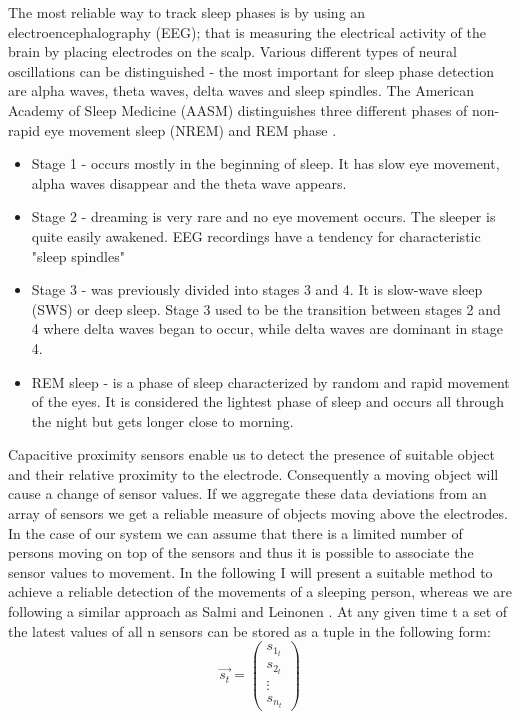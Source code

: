 The most reliable way to track sleep phases is by using an electroencephalography (EEG); that is measuring the electrical activity of the brain by placing electrodes on the scalp. Various different types of neural oscillations can be distinguished - the most important for sleep phase detection are alpha waves, theta waves, delta waves and sleep spindles. The American Academy of Sleep Medicine (AASM) distinguishes three different phases of non-rapid eye movement sleep (NREM) and REM phase \cite{schulz2008rethinking}. 
\begin{itemize}
\item Stage 1 - occurs mostly in the beginning of sleep. It has slow eye movement, alpha waves disappear and the theta wave appears. 
\item Stage 2 - dreaming is very rare and no eye movement occurs. The sleeper is quite easily awakened. EEG recordings have a tendency for characteristic "sleep spindles"
\item Stage 3 - was previously divided into stages 3 and 4. It is slow-wave sleep (SWS) or deep sleep. Stage 3 used to be the transition between stages 2 and 4 where delta waves began to occur, while delta waves are dominant in stage 4. 
\item REM sleep - is a phase of sleep characterized by random and rapid movement of the eyes. It is considered the lightest phase of sleep and occurs all through the night but gets longer close to morning.
\end{itemize}

Capacitive proximity sensors enable us to detect the presence of suitable object and their relative proximity to the electrode. Consequently a moving object will cause a change of sensor values. If we aggregate these data deviations from an array of sensors we get a reliable measure of objects moving above the electrodes. In the case of our system we can assume that there is a limited number of persons moving on top of the sensors and thus it is possible to associate the sensor values to movement. In the following I will present a suitable method to achieve a reliable detection of the movements of a sleeping person, whereas we are following a similar approach as Salmi and Leinonen \cite{salmi86}.
At any given time t a set of the latest values of all n sensors can be stored as a tuple in the following form: 
\begin{equation}
\overrightarrow{s_t}=\begin{pmatrix}
s_{1_t}\\ 
s_{2_t}\\ 
\vdots \\ 
s_{n_t}
\end{pmatrix}
\end{equation} 

